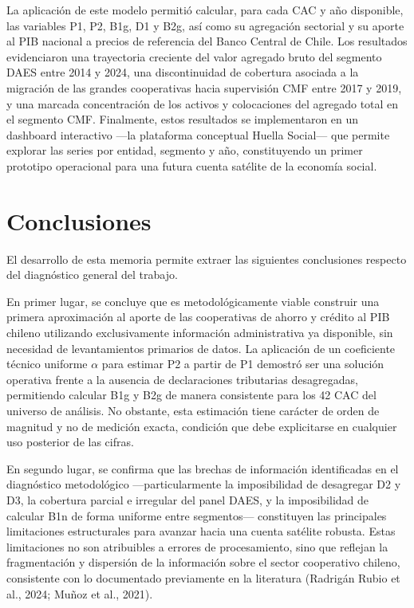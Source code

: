 La aplicación de este modelo permitió calcular, para cada CAC y año disponible, las variables P1, P2, B1g, D1 y B2g, así como su agregación sectorial y su aporte al PIB nacional a precios de referencia del Banco Central de Chile. Los resultados evidenciaron una trayectoria creciente del valor agregado bruto del segmento DAES entre 2014 y 2024, una discontinuidad de cobertura asociada a la migración de las grandes cooperativas hacia supervisión CMF entre 2017 y 2019, y una marcada concentración de los activos y colocaciones del agregado total en el segmento CMF. Finalmente, estos resultados se implementaron en un dashboard interactivo —la plataforma conceptual Huella Social— que permite explorar las series por entidad, segmento y año, constituyendo un primer prototipo operacional para una futura cuenta satélite de la economía social.

\section{Conclusiones}

El desarrollo de esta memoria permite extraer las siguientes conclusiones respecto del diagnóstico general del trabajo.

En primer lugar, se concluye que es metodológicamente viable construir una primera aproximación al aporte de las cooperativas de ahorro y crédito al PIB chileno utilizando exclusivamente información administrativa ya disponible, sin necesidad de levantamientos primarios de datos. La aplicación de un coeficiente técnico uniforme $\alpha$ para estimar P2 a partir de P1 demostró ser una solución operativa frente a la ausencia de declaraciones tributarias desagregadas, permitiendo calcular B1g y B2g de manera consistente para los 42 CAC del universo de análisis. No obstante, esta estimación tiene carácter de orden de magnitud y no de medición exacta, condición que debe explicitarse en cualquier uso posterior de las cifras.

En segundo lugar, se confirma que las brechas de información identificadas en el diagnóstico metodológico —particularmente la imposibilidad de desagregar D2 y D3, la cobertura parcial e irregular del panel DAES, y la imposibilidad de calcular B1n de forma uniforme entre segmentos— constituyen las principales limitaciones estructurales para avanzar hacia una cuenta satélite robusta. Estas limitaciones no son atribuibles a errores de procesamiento, sino que reflejan la fragmentación y dispersión de la información sobre el sector cooperativo chileno, consistente con lo documentado previamente en la literatura (Radrigán Rubio et al., 2024; Muñoz et al., 2021).

